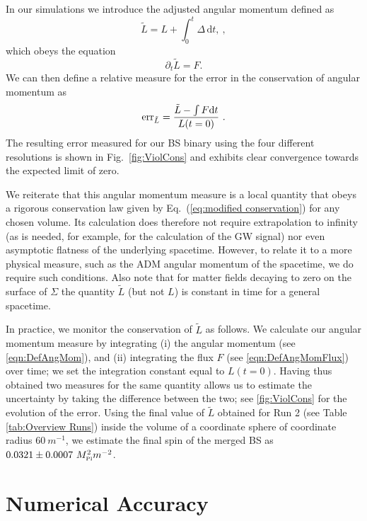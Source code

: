 \documentclass[11pt]{report}  %
\newcommand{\mpl}{M_{\mbox{\tiny Pl}}}
\newcommand{\dd}{\mathrm{d}}
\begin{document}
In our simulations we introduce the adjusted angular momentum
defined as
\begin{equation}
 \tilde{L} = {L}+\int_{0}^t {\Delta} \,\dd t, \label{eqn:DefAngMom}~,
\end{equation}
which obeys the equation 
\begin{equation}
\label{eq:modified conservation}\partial_t\tilde{L} = {F}.
\end{equation}
We can then define a relative measure for the error in the
conservation of angular momentum as
\begin{equation}
    {\rm err }_{\tilde{L}} = \frac{\tilde{L} - \int F {\rm d}t}{{L}(t=0)}~.\label{eqn:ang_mom}
\end{equation}
The resulting error measured for our BS binary using the
four different resolutions is shown in Fig.~\ref{fig:ViolCons}
and exhibits clear convergence towards the expected limit of
zero.

We reiterate that this angular momentum measure is a
local quantity that obeys a rigorous conservation law
given by Eq.~(\ref{eq:modified conservation}) for
any chosen volume.
Its calculation does therefore not require extrapolation
to infinity (as is needed, for example, for the calculation
of the GW signal) nor even asymptotic flatness of the underlying spacetime.
However, to relate it to a more physical measure, such as the ADM angular momentum of the spacetime, we do require such conditions.
Also note that for matter fields decaying to zero on the surface of $\Sigma$ the quantity $\tilde{L}$ (but not $L$) is constant in time for a general spacetime. 

In practice, we monitor the conservation of $\tilde{L}$ as follows.
We calculate our angular momentum measure by integrating (i) the angular momentum (see \cref{eqn:DefAngMom}), and (ii) integrating the flux $F$ (see \cref{eqn:DefAngMomFlux}) over time; we set the integration constant equal to ${L}(t=0)$. Having thus obtained two measures for the same quantity allows us to estimate the uncertainty by taking the difference between the two; see \cref{fig:ViolCons} for the evolution of the error. 
Using the final value of $\tilde{L}$ obtained for Run 2
(see Table \ref{tab:Overview Runs}) inside the volume of
a coordinate sphere of coordinate radius $60~m^{-1}$, we estimate the final spin
of the merged BS as $0.0321 \pm 0.0007~\mpl^2 m^{-2}$.

\section{Numerical Accuracy}
\label{sec:numacc}
\end{document}
